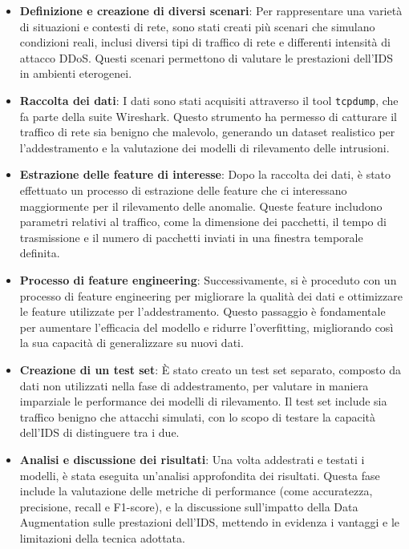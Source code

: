 \begin{itemize}
    \item \textbf{Definizione e creazione di diversi scenari}: Per rappresentare una varietà di situazioni e contesti di rete, sono stati creati più scenari che simulano condizioni reali, inclusi diversi tipi di traffico di rete e differenti intensità di attacco DDoS. Questi scenari permettono di valutare le prestazioni dell'IDS in ambienti eterogenei.
    
    \item \textbf{Raccolta dei dati}: I dati sono stati acquisiti attraverso il tool \texttt{tcpdump}, che fa parte della suite Wireshark. Questo strumento ha permesso di catturare il traffico di rete sia benigno che malevolo, generando un dataset realistico per l'addestramento e la valutazione dei modelli di rilevamento delle intrusioni.
    
    \item \textbf{Estrazione delle feature di interesse}: Dopo la raccolta dei dati, è stato effettuato un processo di estrazione delle feature che ci interessano maggiormente per il rilevamento delle anomalie. Queste feature includono parametri relativi al traffico, come la dimensione dei pacchetti, il tempo di trasmissione e il numero di pacchetti inviati in una finestra temporale definita.
    
    \item \textbf{Processo di feature engineering}: Successivamente, si è proceduto con un processo di feature engineering per migliorare la qualità dei dati e ottimizzare le feature utilizzate per l'addestramento. Questo passaggio è fondamentale per aumentare l'efficacia del modello e ridurre l'overfitting, migliorando così la sua capacità di generalizzare su nuovi dati.
    
    \item \textbf{Creazione di un test set}: È stato creato un test set separato, composto da dati non utilizzati nella fase di addestramento, per valutare in maniera imparziale le performance dei modelli di rilevamento. Il test set include sia traffico benigno che attacchi simulati, con lo scopo di testare la capacità dell'IDS di distinguere tra i due.
    
    \item \textbf{Analisi e discussione dei risultati}: Una volta addestrati e testati i modelli, è stata eseguita un'analisi approfondita dei risultati. Questa fase include la valutazione delle metriche di performance (come accuratezza, precisione, recall e F1-score), e la discussione sull'impatto della Data Augmentation sulle prestazioni dell'IDS, mettendo in evidenza i vantaggi e le limitazioni della tecnica adottata.
\end{itemize}

